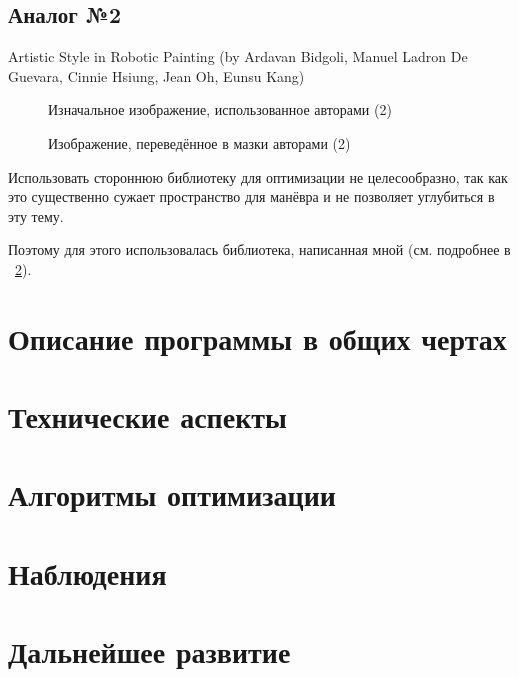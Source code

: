 \documentclass[11pt]{article}
\begin{document}
    \FloatBarrier

    \subsection{Аналог №2}
    Artistic Style in Robotic Painting (by Ardavan Bidgoli, Manuel Ladron De Guevara, Cinnie Hsiung, Jean Oh, Eunsu Kang)

    \begin{figure}[h!]
        \centering
        \caption{Изначальное изображение, использованное авторами (2)}
        \label{fig:initial_bidgoli}
    \end{figure}

    \begin{figure}[h!]
        \centering
        \caption{Изображение, переведённое в мазки авторами (2)}
        \label{fig:result_bidgoli}
    \end{figure}

    \FloatBarrier




    Использовать стороннюю библиотеку для оптимизации не целесообразно,
    так как это существенно сужает пространство для манёвра и не позволяет
    углубиться в эту тему.

    Поэтому для этого использовалась библиотека, написанная мной (см. подробнее в ~\ref{sec:tecnical}).

    \section{Описание программы в общих чертах}\label{sec:general_description}
    

    \section{Технические аспекты}\label{sec:tecnical}
    

    \section {Алгоритмы оптимизации}\label{sec:opimization_algorithms}
    

    \section{Наблюдения}\label{sec:observations}
    

    \section{Дальнейшее развитие}\label{sec:todo}
    
\end{document}
